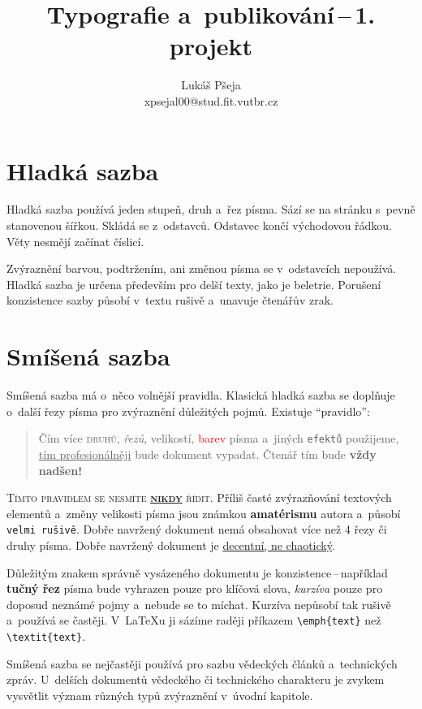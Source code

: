 \documentclass[twocolumn]{article}[23.02.2024]
\title{Typografie a~publikování\,--\,1. projekt}
\author{Lukáš Pšeja \\ xpsejal00@stud.fit.vutbr.cz}
\date{}
\begin{document}
\maketitle

\section{Hladká sazba}
Hladká sazba používá jeden stupeň, druh a~řez písma.
Sází se na stránku s~pevně stanovenou šířkou.
Skládá se z~odstavců. Odstavec končí východovou řádkou.
Věty nesmějí začínat číslicí.

Zvýraznění barvou, podtržením, ani změnou písma se v~odstavcích nepoužívá.
Hladká sazba je určena především pro delší texty, jako je beletrie.
Porušení konzistence sazby působí v~textu rušivě a~unavuje čtenářův zrak.

\section{Smíšená sazba}
\label{sec:smisena_sazba}
Smíšená sazba má o~něco volnější pravidla.
Klasická hladká sazba se doplňuje o~další řezy písma pro zvýraznění důležitých pojmů.
Existuje \enquote{pravidlo}:

\begin{quotation}
    Čím více \textsc{druhů}, \emph{řezů}, {\scriptsize{velikostí}}, \textcolor{red}{barev} písma a~jiných \texttt{efektů} použijeme, \underline{tím profesionálněji} bude {\selectfont dokument} vypadat.
    Čtenář tím bude \textbf{\LARGE{vždy nadšen!}}
\end{quotation}

\textsc{Tímto pravidlem se nesmíte \textbf{\underline{nikdy}} řídit.}
Příliš časté zvýrazňování textových elementů a~změny {\tiny{velikosti}} písma jsou známkou \textbf{amatérismu} autora a~působí \texttt{velmi rušivě}.
Dobře navržený dokument nemá obsahovat více než 4 řezy či druhy písma.
Dobře navržený dokument je \underline{decentní, ne chaotický}.

Důležitým znakem správně vysázeného dokumentu je konzistence\,--\,například \textbf{tučný řez} písma bude vyhrazen pouze pro klíčová slova, \emph{kurzíva} pouze pro doposud neznámé pojmy a~nebude se to míchat.
Kurzíva nepůsobí tak rušivě a~používá se častěji.
V~{\LaTeX}u ji sázíme raději příkazem \verb|\emph{text}| než \verb|\textit{text}|.

Smíšená sazba se nejčastěji používá pro sazbu vědeckých článků a~technických zpráv.
U~delších dokumentů vědeckého či technického charakteru je zvykem vysvětlit význam různých typů zvýraznění v~úvodní kapitole.
\end{document}
